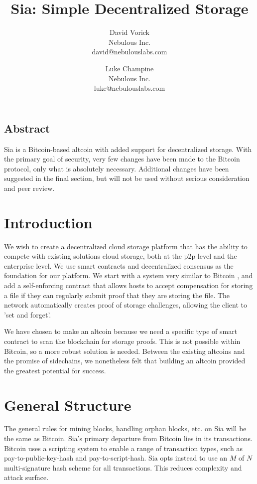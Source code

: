 \documentclass[twocolumn]{article}
\begin{document}
\frenchspacing

\title{Sia: Simple Decentralized Storage}

\author{
{\rm David Vorick}\\
Nebulous Inc.\\
david@nebulouslabs.com
\and
{\rm Luke Champine}\\
Nebulous Inc.\\
luke@nebulouslabs.com
}

\maketitle

\subsection*{Abstract}
Sia is a Bitcoin-based altcoin with added support for decentralized storage.
With the primary goal of security, very few changes have been made to the Bitcoin protocol, only what is absolutely necessary.
Additional changes have been suggested in the final section, but will not be used without serious consideration and peer review.

\section{Introduction}
We wish to create a decentralized cloud storage platform that has the ability to compete with existing solutions cloud storage, both at the p2p level and the enterprise level.
We use smart contracts and decentralized consensus as the foundation for our platform.
We start with a system very similar to Bitcoin \cite{btc}\cite{btcdg}, and add a self-enforcing contract that allows hosts to accept compensation for storing a file if they can regularly submit proof that they are storing the file.
The network automatically creates proof of storage challenges, allowing the client to 'set and forget'.

We have chosen to make an altcoin because we need a specific type of smart contract to scan the blockchain for storage proofs.
This is not possible within Bitcoin, so a more robust solution is needed.
Between the existing altcoins and the promise of sidechains, we nonetheless felt that building an altcoin provided the greatest potential for success.

\section{General Structure}
The general rules for mining blocks, handling orphan blocks, etc. on Sia will be the same as Bitcoin.
Sia's primary departure from Bitcoin lies in its transactions.
Bitcoin uses a scripting system to enable a range of transaction types, such as pay-to-public-key-hash and pay-to-script-hash.
Sia opts instead to use an $M$ of $N$ multi-signature hash scheme for all transactions.
This reduces complexity and attack surface.
\end{document}

